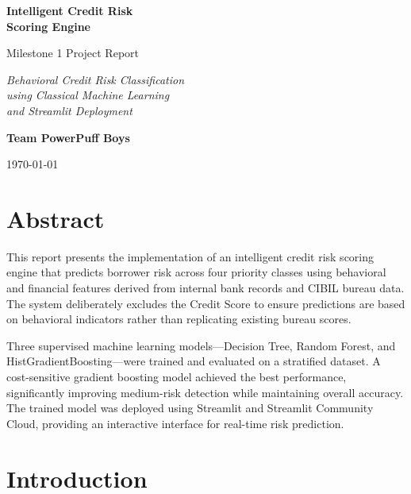\documentclass[12pt,a4paper]{article}
\begin{document}
\begin{titlepage}
    \centering
    \vspace*{2cm}

    {\Huge\bfseries\color{titleblue}
        Intelligent Credit Risk\\[0.3em]
        Scoring Engine\\[1.5em]
    }

    {\Large Milestone 1 Project Report\\[2em]}

    {\large\itshape
        Behavioral Credit Risk Classification\\
        using Classical Machine Learning\\
        and Streamlit Deployment\\[3em]
    }

    {\Large\bfseries Team PowerPuff Boys\\[2em]}

    \vfill
    {\large \today}

\end{titlepage}

\tableofcontents
\newpage

\section{Abstract}

This report presents the implementation of an intelligent credit risk scoring engine that predicts borrower risk across four priority classes using behavioral and financial features derived from internal bank records and CIBIL bureau data. The system deliberately excludes the Credit Score to ensure predictions are based on behavioral indicators rather than replicating existing bureau scores.

Three supervised machine learning models---Decision Tree, Random Forest, and HistGradientBoosting---were trained and evaluated on a stratified dataset. A cost-sensitive gradient boosting model achieved the best performance, significantly improving medium-risk detection while maintaining overall accuracy. The trained model was deployed using Streamlit and Streamlit Community Cloud, providing an interactive interface for real-time risk prediction.

\section{Introduction}
\end{document}
